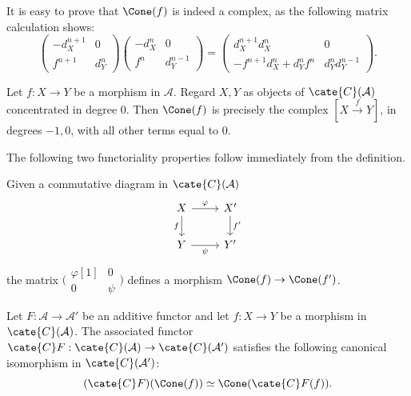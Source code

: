It is easy to prove that $\Cone(f)$ is indeed a complex, as the following
matrix calculation shows:
\[ \begin{pmatrix} -d_X^{n+1} & 0 \\ f^{n+1} & d_Y^n \end{pmatrix} \begin{pmatrix} -d_X^n & 0 \\ f^n & d_Y^{n-1} \end{pmatrix} =
\begin{pmatrix} d_X^{n+1} d_X^n & 0 \\ - f^{n+1} d_X^n + d_Y^n f^n & d_Y^n d_Y^{n-1} \end{pmatrix}. \]

\begin{example}
	Let $f:X\to Y$ be a morphism in $\mathcal{A}$. Regard $X,Y$ as objects
	of $\cate{C}(\mathcal{A})$ concentrated in degree $0$. Then $\Cone(f)$ is
	precisely the complex $[X\xrightarrow{f}Y]$, in degrees $-1,0$, with all
	other terms equal to $0$.
\end{example}

The following two functoriality properties follow immediately from the
definition.

\begin{proposition}\label{prop:cone-functorial}
	Given a commutative diagram in $\cate{C}(\mathcal{A})$
	\[\begin{tikzcd}
		X \arrow[d, "f"'] \arrow[r, "\varphi"] & X' \arrow[d, "{f'}"] \\
		Y \arrow[r, "\psi"'] & Y'
	\end{tikzcd}\]
	the matrix $\bigl(\begin{smallmatrix} \varphi[1] & 0 \\ 0 & \psi \end{smallmatrix}\bigr)$
	defines a morphism $\Cone(f)\to\Cone(f')$.
\end{proposition}

\begin{proposition}\label{prop:Cone-A}
	Let $F:\mathcal{A}\to\mathcal{A}'$ be an additive functor and let
	$f:X\to Y$ be a morphism in $\cate{C}(\mathcal{A})$. The associated
	functor $\cate{C}F:\cate{C}(\mathcal{A})\to
	\cate{C}(\mathcal{A}')$ satisfies the following canonical isomorphism in
	$\cate{C}(\mathcal{A}')$:
	\[ (\cate{C}F)(\Cone(f)) \simeq \Cone(\cate{C}F(f)). \]
\end{proposition}

